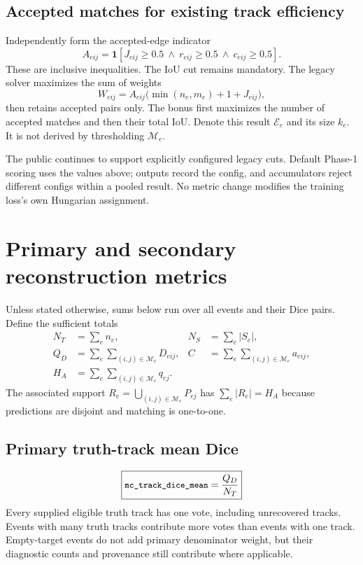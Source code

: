 \documentclass[11pt,letterpaper]{article}
\newcommand{\metric}[1]{\texttt{\small\detokenize{#1}}}
\newcommand{\code}[1]{\texttt{\detokenize{#1}}}
\begin{document}
\subsection{Accepted matches for existing track efficiency}

Independently form the accepted-edge indicator
\begin{equation}
 A_{eij}=\mathbf1[J_{eij}\ge0.5\ \land\ r_{eij}\ge0.5\ \land\ c_{eij}\ge0.5].
\end{equation}
These are inclusive inequalities. The IoU cut remains mandatory. The legacy
solver maximizes the sum of weights
\begin{equation}
 W_{eij}=A_{eij}\bigl(\min(n_e,m_e)+1+J_{eij}\bigr),
\end{equation}
then retains accepted pairs only. The bonus first maximizes the number of
accepted matches and then their total IoU. Denote this result $\mathcal E_e$ and
its size $k_e$. It is not derived by thresholding $\mathcal M_e$.

The public \code{MatchConfig} continues to support explicitly configured legacy
cuts. Default Phase-1 scoring uses the values above; outputs record the config,
and accumulators reject different configs within a pooled result. No metric
change modifies the training loss's own Hungarian assignment.

\section{Primary and secondary reconstruction metrics}

Unless stated otherwise, sums below run over all events and their Dice pairs.
Define the sufficient totals
\begin{align}
 N_T&=\sum_e n_e,& N_S&=\sum_e|S_e|,\\
 Q_D&=\sum_e\sum_{(i,j)\in\mathcal M_e}D_{eij},&
 C&=\sum_e\sum_{(i,j)\in\mathcal M_e}a_{eij},\\
 H_A&=\sum_e\sum_{(i,j)\in\mathcal M_e}q_{ej}.&&
\end{align}
The associated support $R_e=\bigcup_{(i,j)\in\mathcal M_e}P_{ej}$ has
$\sum_e|R_e|=H_A$ because predictions are disjoint and matching is one-to-one.

\subsection{Primary truth-track mean Dice}
\begin{equation}
 \boxed{\metric{mc_track_dice_mean}=\frac{Q_D}{N_T}}
\end{equation}
Every supplied eligible truth track has one vote, including unrecovered tracks.
Events with many truth tracks contribute more votes than events with one track.
Empty-target events do not add primary denominator weight, but their diagnostic
counts and provenance still contribute where applicable.
\end{document}
